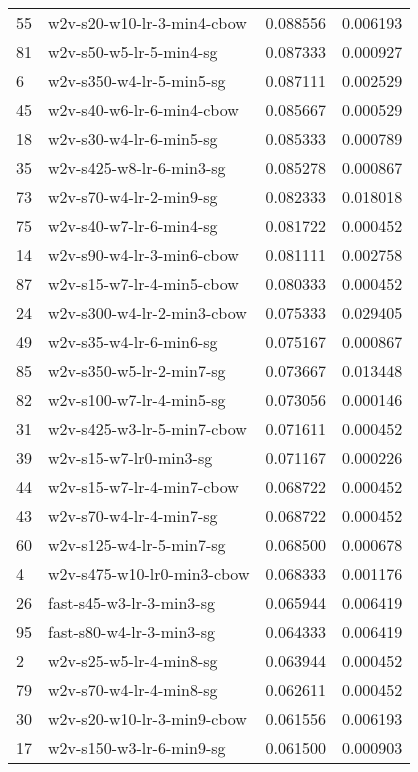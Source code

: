 {\begin{tabular}{llrr}
55 &    w2v-s20-w10-lr-3-min4-cbow &  0.088556 &  0.006193 \\
81 &       w2v-s50-w5-lr-5-min4-sg &  0.087333 &  0.000927 \\
6  &      w2v-s350-w4-lr-5-min5-sg &  0.087111 &  0.002529 \\
45 &     w2v-s40-w6-lr-6-min4-cbow &  0.085667 &  0.000529 \\
18 &       w2v-s30-w4-lr-6-min5-sg &  0.085333 &  0.000789 \\
35 &      w2v-s425-w8-lr-6-min3-sg &  0.085278 &  0.000867 \\
73 &       w2v-s70-w4-lr-2-min9-sg &  0.082333 &  0.018018 \\
75 &       w2v-s40-w7-lr-6-min4-sg &  0.081722 &  0.000452 \\
14 &     w2v-s90-w4-lr-3-min6-cbow &  0.081111 &  0.002758 \\
87 &     w2v-s15-w7-lr-4-min5-cbow &  0.080333 &  0.000452 \\
24 &    w2v-s300-w4-lr-2-min3-cbow &  0.075333 &  0.029405 \\
49 &       w2v-s35-w4-lr-6-min6-sg &  0.075167 &  0.000867 \\
85 &      w2v-s350-w5-lr-2-min7-sg &  0.073667 &  0.013448 \\
82 &      w2v-s100-w7-lr-4-min5-sg &  0.073056 &  0.000146 \\
31 &    w2v-s425-w3-lr-5-min7-cbow &  0.071611 &  0.000452 \\
39 &        w2v-s15-w7-lr0-min3-sg &  0.071167 &  0.000226 \\
44 &     w2v-s15-w7-lr-4-min7-cbow &  0.068722 &  0.000452 \\
43 &       w2v-s70-w4-lr-4-min7-sg &  0.068722 &  0.000452 \\
60 &      w2v-s125-w4-lr-5-min7-sg &  0.068500 &  0.000678 \\
4  &    w2v-s475-w10-lr0-min3-cbow &  0.068333 &  0.001176 \\
26 &      fast-s45-w3-lr-3-min3-sg &  0.065944 &  0.006419 \\
95 &      fast-s80-w4-lr-3-min3-sg &  0.064333 &  0.006419 \\
2  &       w2v-s25-w5-lr-4-min8-sg &  0.063944 &  0.000452 \\
79 &       w2v-s70-w4-lr-4-min8-sg &  0.062611 &  0.000452 \\
30 &    w2v-s20-w10-lr-3-min9-cbow &  0.061556 &  0.006193 \\
17 &      w2v-s150-w3-lr-6-min9-sg &  0.061500 &  0.000903 \\

\end{tabular}}
